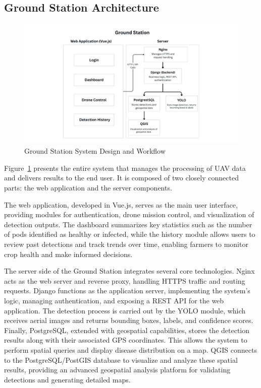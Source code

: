 \subsection{Ground Station Architecture}

\begin{figure}[H]
	\centering
	\caption{Ground Station System Design and Workflow}
	\label{fig:GroundStation}
	\includegraphics[width=1\textwidth]{figures/Ground_Station.pdf}
\end{figure}

Figure~\ref{fig:GroundStation} presents the entire system that manages the processing of UAV data and delivers results to the end user. It is composed of two closely connected parts: the web application and the server components.

The web application, developed in Vue.js, serves as the main user interface, providing modules for authentication, drone mission control, and visualization of detection outputs. The dashboard summarizes key statistics such as the number of pods identified as healthy or infected, while the history module allows users to review past detections and track trends over time, enabling farmers to monitor crop health and make informed decisions.


The server side of the Ground Station integrates several core technologies. Nginx acts as the web server and reverse proxy, handling HTTPS traffic and routing requests. Django functions as the application server, implementing the system’s logic, managing authentication, and exposing a REST API for the web application. The detection process is carried out by the YOLO module, which receives aerial images and returns bounding boxes, labels, and confidence scores. Finally, PostgreSQL, extended with geospatial capabilities, stores the detection results along with their associated GPS coordinates. This allows the system to perform spatial queries and display disease distribution on a map. QGIS connects to the PostgreSQL/PostGIS database to visualize and analyze these spatial results, providing an advanced geospatial analysis platform for validating detections and generating detailed maps.

